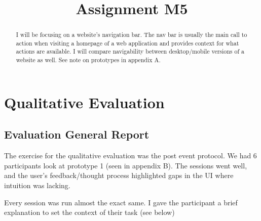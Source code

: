 

\title{Assignment M5\\}



\maketitle
\thispagestyle{fancy}

\begin{abstract}
I will be focusing on a website’s navigation bar. The nav bar is usually the main call to action when visiting a homepage of a web application and provides context for what actions are available. I will compare navigability between desktop/mobile versions of a website as well. See note on prototypes in appendix A.
\end{abstract}

\section{Qualitative Evaluation}

\subsection{Evaluation General Report}

The exercise for the qualitative evaluation was the post event protocol. We had 6 participants look at prototype 1 (seen in appendix B). The sessions went well, and the user's feedback/thought process highlighted gaps in the UI where intuition was lacking.

Every session was run almost the exact same. I gave the participant a brief explanation to set the context of their task (see below)


